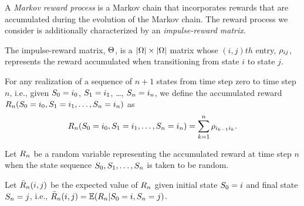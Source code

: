 A \emph{Markov reward process} is a Markov chain that incorporates rewards that are accumulated during the evolution of the Markov chain.  The reward process we consider is additionally characterized by an \emph{impulse-reward matrix}.

\begin{mydef}
	The impulse-reward matrix, $\Theta$, is a $|\Omega| \times |\Omega|$ matrix whose $(i, j)th$ entry, $\rho_{ij}$, represents the reward accumulated when transitioning from state $i$ to state $j$.
\end{mydef}
%
%
%
For any realization of a sequence of $n+1$ states from time step zero to time step $n$, i.e., given $S_{0} = i_{0}$, $S_{1} = i_{1}$, \ldots, $S_{n} = i_{n}$, we define the accumulated reward $R_{n}(S_{0} = i_{0}, S_{1} = i_{1}, \ldots, S_{n} = i_{n})$ as 
%
\begin{equation}
	\label{eq:Rn}
	R_{n}(S_{0} = i_{0}, S_{1} = i_{1}, \ldots, S_{n} = i_{n}) = \sum_{k = 1}^{n} \rho_{i_{k-1}i_{k}}.
\end{equation}

%


\begin{mydef}
\label{def:Rn}
	Let $R_{n}$ be a random variable representing the accumulated reward at time step $n$ when the state sequence $S_{0}, S_{1}, \ldots, S_{n}$ is taken to be random.   
\end{mydef}

\begin{mydef}
	\label{def:barRij}
	Let $\bar{R}_{n}(i, j)$ be the expected value of $R_{n}$ given initial state $S_{0} = i$ and final state $S_{n} = j$, i.e., $\bar{R}_{n}(i, j) = \mathbb{E}(R_{n} | S_{0} = i, S_{n} = j)$.  
\end{mydef}

